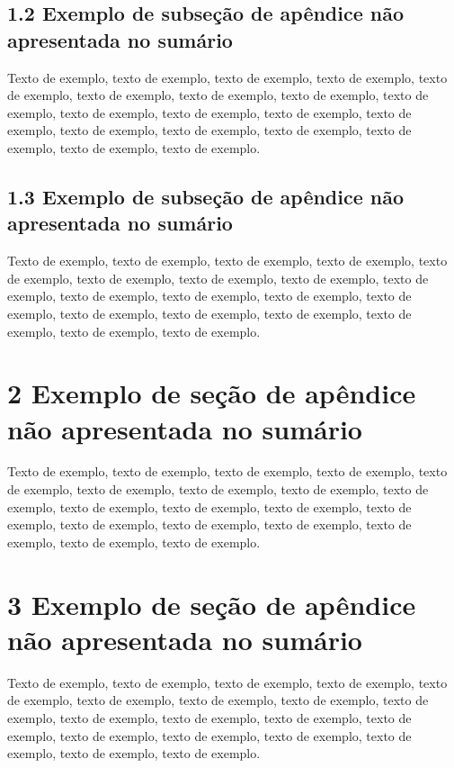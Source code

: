 \documentclass[
	12pt,				%
	oneside,			%
	a4paper,			%
	english,			%
	brazil				%
	]{abntex2ppgsi}
\begin{document}
\begin{apendicesenv}
\subsection*{1.2 Exemplo de subseção de apêndice não apresentada no sumário}

Texto de exemplo, texto de exemplo, texto de exemplo, texto de exemplo, texto de exemplo, texto de exemplo, texto de exemplo, texto de exemplo, texto de exemplo, texto de exemplo, texto de exemplo, texto de exemplo, texto de exemplo, texto de exemplo, texto de exemplo, texto de exemplo, texto de exemplo, texto de exemplo, texto de exemplo.

\subsection*{1.3 Exemplo de subseção de apêndice não apresentada no sumário}

Texto de exemplo, texto de exemplo, texto de exemplo, texto de exemplo, texto de exemplo, texto de exemplo, texto de exemplo, texto de exemplo, texto de exemplo, texto de exemplo, texto de exemplo, texto de exemplo, texto de exemplo, texto de exemplo, texto de exemplo, texto de exemplo, texto de exemplo, texto de exemplo, texto de exemplo.

\section*{2 Exemplo de seção de apêndice não apresentada no sumário}

Texto de exemplo, texto de exemplo, texto de exemplo, texto de exemplo, texto de exemplo, texto de exemplo, texto de exemplo, texto de exemplo, texto de exemplo, texto de exemplo, texto de exemplo, texto de exemplo, texto de exemplo, texto de exemplo, texto de exemplo, texto de exemplo, texto de exemplo, texto de exemplo, texto de exemplo.

\section*{3 Exemplo de seção de apêndice não apresentada no sumário}

Texto de exemplo, texto de exemplo, texto de exemplo, texto de exemplo, texto de exemplo, texto de exemplo, texto de exemplo, texto de exemplo, texto de exemplo, texto de exemplo, texto de exemplo, texto de exemplo, texto de exemplo, texto de exemplo, texto de exemplo, texto de exemplo, texto de exemplo, texto de exemplo, texto de exemplo.



\end{apendicesenv}
\end{document}
